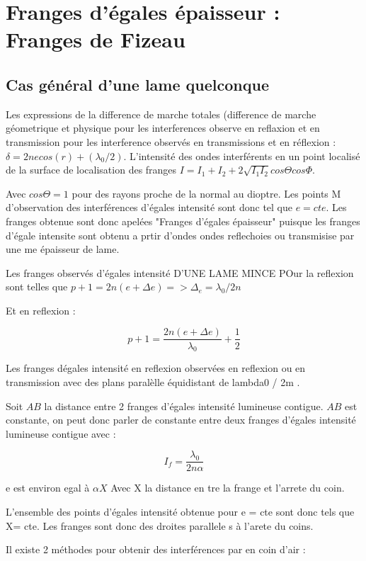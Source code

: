 \documentclass[a4paper,12pt]{article}
\theoremstyle{StyleTheo_will}
\theoremstyle{remark}
\begin{document}
\section{Franges d'égales épaisseur : Franges de Fizeau}
\subsection{Cas général d'une lame quelconque}

Les expressions de la difference de marche totales (difference de marche géometrique et physique pour les interferences observe en reflaxion et en transmission pour les interference observés en transmissions et en réflexion :
$
\delta = 2ne cos(r) +(\lambda_0/2)
$.
L'intensité des ondes interférents en un point localisé de la surface de localisation des franges $ I = I_1 +I_2+2\sqrt{I_1I_2}cos\Theta  cos \Phi$.

Avec $cos\Theta = 1$ pour des rayons proche de la normal au dioptre. Les points M d'observation des interférences d'égales intensité sont donc tel que $e=cte$. Les franges obtenue sont donc apelées "Franges d'égales épaisseur" puisque les franges d'égale intensite sont obtenu a prtir d'ondes ondes reflechoies ou transmisise par une me épaisseur de lame. 

Les franges observés d'égales intensité D'UNE LAME MINCE POur la reflexion sont telles que $p+1 = 2n(e+\Delta e) => \Delta_e=\lambda_0/2n$

Et en reflexion : 

\[ p+1 = \frac{2n(e+\Delta e)}{\lambda_0} +\frac{1}{2}\]



Les franges dégales intensité en reflexion observées en reflexion ou en transmission avec des plans paralèlle équidistant de lambda0 / 2m .

Soit $AB$ la distance entre 2 franges d'égales intensité lumineuse contigue. $AB$ est constante, on peut donc parler de constante entre deux franges d'égales intensité lumineuse contigue avec : 

 \[I_f = \frac{\lambda_0}{2n\alpha}\]
 
  e est environ egal à $\alpha X$ Avec X la distance en tre la frange et l'arrete du coin.

L'ensemble des points d'égales intensité obtenue pour e = cte sont donc tels que X= cte. Les franges sont donc des droites parallele s à l'arete du coins.

Il existe 2 méthodes pour obtenir des interférences par en coin d'air :
\end{document}
